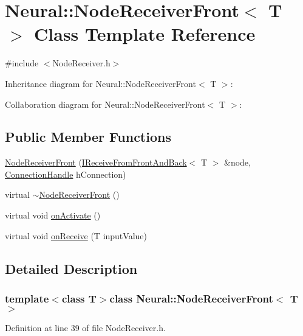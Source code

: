 \hypertarget{class_neural_1_1_node_receiver_front}{
\section{Neural::NodeReceiverFront$<$ T $>$ Class Template Reference}
\label{class_neural_1_1_node_receiver_front}
}


{\ttfamily \#include $<$NodeReceiver.h$>$}



Inheritance diagram for Neural::NodeReceiverFront$<$ T $>$:


Collaboration diagram for Neural::NodeReceiverFront$<$ T $>$:
\subsection*{Public Member Functions}
\begin{DoxyCompactItemize}
\item 
\hyperlink{class_neural_1_1_node_receiver_front_af997426d14bade18efe96f553dcc2070}{NodeReceiverFront} (\hyperlink{class_neural_1_1_i_receive_from_front_and_back}{IReceiveFromFrontAndBack}$<$ T $>$ \&node, \hyperlink{namespace_neural_a73b2763d14999ad4308dbf4246aa503f}{ConnectionHandle} hConnection)
\item 
virtual \hyperlink{class_neural_1_1_node_receiver_front_acaba61af6774b45390a6717848408830}{$\sim$NodeReceiverFront} ()
\item 
virtual void \hyperlink{class_neural_1_1_node_receiver_front_acfc33db027b01410110148bac921ef17}{onActivate} ()
\item 
virtual void \hyperlink{class_neural_1_1_node_receiver_front_a7d9e947a159607ad16b98c0a57c2c7cf}{onReceive} (T inputValue)
\end{DoxyCompactItemize}


\subsection{Detailed Description}
\subsubsection*{template$<$class T$>$class Neural::NodeReceiverFront$<$ T $>$}



Definition at line 39 of file NodeReceiver.h.



